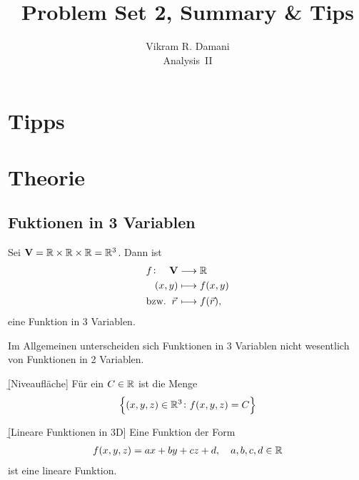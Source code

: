 \documentclass[12pt]{article}
\begin{document}
\title{\vspace*{-2.5em}Problem Set 2, Summary \& Tips}
\author{Vikram R. Damani\\
    Analysis~II}

\maketitle

\section{Tipps}

\section{Theorie}

\subsection{Fuktionen in 3 Variablen}

\begin{thmb}{}
    Sei $\mathbf{V}=\mathbb{R}\times\mathbb{R}\times\mathbb{R}=\mathbb{R}^3$. Dann ist
    \begin{align}
         & \begin{aligned}
               f\colon\quad \mathbf{V} & \longrightarrow\mathbb{R}  \\
               (x,y)                   & \longmapsto f(x,y)
           \end{aligned}    \\
         & \text{bzw.}\ \:\vec{r}\,\longmapsto f(\vec{r}),
    \end{align}
    eine Funktion in 3 Variablen.
\end{thmb}

Im Allgemeinen unterscheiden sich Funktionen in 3 Variablen nicht wesentlich
von Funktionen in 2 Variablen.\vspace*{1em}

\begin{defn}{\b{[Niveaufläche]}}
    Für ein $C\in\mathbb{R}$ ist die Menge
    \begin{align}
        \left\{(x,y,z)\in\mathbb{R}^3\colon f(x,y,z)=C\right\}
    \end{align}
\end{defn}

\begin{defn}{\b{{[Lineare Funktionen in 3D]}}}
    Eine Funktion der Form
    \begin{align}
        f(x,y,z)=ax+by+cz+d, \quad a,b,c,d\in\mathbb{R}
    \end{align}
    ist eine lineare Funktion.
\end{defn}\vspace*{1em}
\end{document}
